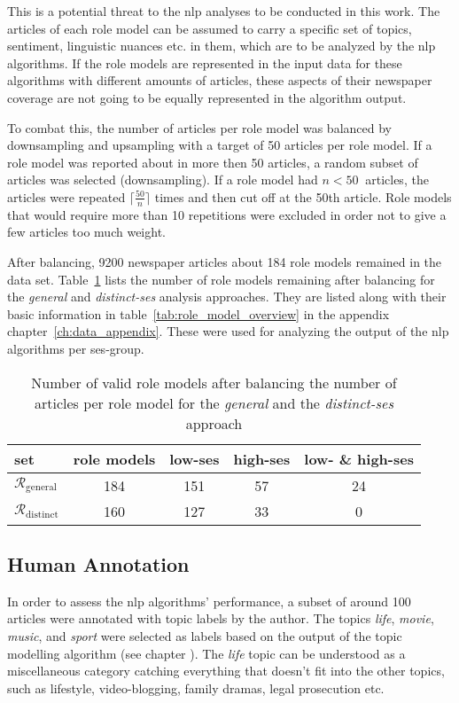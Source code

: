 This is a potential threat to the \gls{nlp} analyses to be conducted in this work. The articles of each role model can be assumed to carry a specific set of topics, sentiment, linguistic nuances etc. in them, which are to be analyzed by the \gls{nlp} algorithms. If the role models are represented in the input data for these algorithms with different amounts of articles, these aspects of their newspaper coverage are not going to be equally represented in the algorithm output.

To combat this, the number of articles per role model was balanced by downsampling and upsampling \autocite{kumar_5_2021} with a target of \SI{50}{} articles per role model. If a role model was reported about in more then \SI{50}{} articles, a random subset of articles was selected (downsampling). If a role model had $n < \SI{50}{}$ articles, the articles were repeated $\lceil \frac{50}{n} \rceil$ times and then cut off at the 50th article. Role models that would require more than \SI{10}{} repetitions were excluded in order not to give a few articles too much weight.

After balancing, \SI{9200}{} newspaper articles about \SI{184}{} role models remained in the data set. Table~\ref{tab:role_models_after_balancing} lists the number of role models remaining after balancing for the \textit{general} and \textit{distinct-\gls{ses}} analysis approaches. They are listed along with their basic information in table~\ref{tab:role_model_overview} in the appendix chapter~\ref{ch:data_appendix}. These were used for analyzing the output of the \gls{nlp} algorithms per \gls{ses}-group.

\begin{table}
    \centering
    \begin{tabular}{lcccc}
        \toprule 
        set & role models & low-\gls{ses} & high-\gls{ses} & low- \& high-\gls{ses} \\ \toprule 
        $\mathcal{R}_\text{general}$ & \SI{184}{} & \SI{151}{} & \SI{57}{} & \SI{24}{} \\
        $\mathcal{R}_\text{distinct}$ & \SI{160}{} & \SI{127}{} & \SI{33}{} & \SI{0}{} \\
        \bottomrule
    \end{tabular}
    \caption{Number of valid role models after balancing the number of articles per role model for the \textit{general} and the \textit{distinct-\gls{ses}} approach}
    \label{tab:role_models_after_balancing}
\end{table}

\subsection*{Human Annotation}
In order to assess the \gls{nlp} algorithms' performance, a subset of around \SI{100}{} articles were annotated with topic labels by the author. The topics \textit{life}, \textit{movie}, \textit{music}, and \textit{sport} were selected as labels based on the output of the topic modelling algorithm (see chapter ). The \textit{life} topic can be understood as a miscellaneous category catching everything that doesn't fit into the other topics, such as lifestyle, video-blogging, family dramas, legal prosecution etc.

